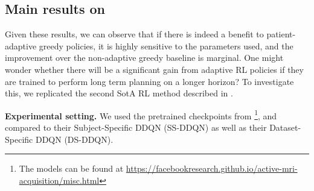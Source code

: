 \begin{figure}[!h]
    \begin{center}
    \resizebox{\linewidth}{!}{}
    \label{tab:bakker_LH_at_25} 
    \end{center}
   
\end{figure}

\begin{figure}[!h]
    \begin{center}
    \resizebox{\linewidth}{!}{}
    \label{tab:bakker_LH_auc} 
    \end{center}
   
\end{figure}






\subsection{Main results on \texorpdfstring{\cite{pineda2020active}}{Pineda et al. (2020)}}
\label{s:long_range}

Given these results, we can observe that if there is indeed a benefit to patient-adaptive greedy policies, it is highly sensitive to the parameters used, and the improvement over the non-adaptive greedy baseline is marginal.
One might wonder whether there will be a significant gain from adaptive RL policies if they are trained to perform long term planning on a longer horizon? To investigate this, we replicated the second SotA RL method described in  \cite{pineda2020active}.


\textbf{Experimental setting.} We used the pretrained checkpoints from \citet{pineda2020active}\footnote{The models can be found at \url{https://facebookresearch.github.io/active-mri-acquisition/misc.html}}, and compared to their Subject-Specific DDQN (SS-DDQN) as well as their Dataset-Specific DDQN (DS-DDQN).

